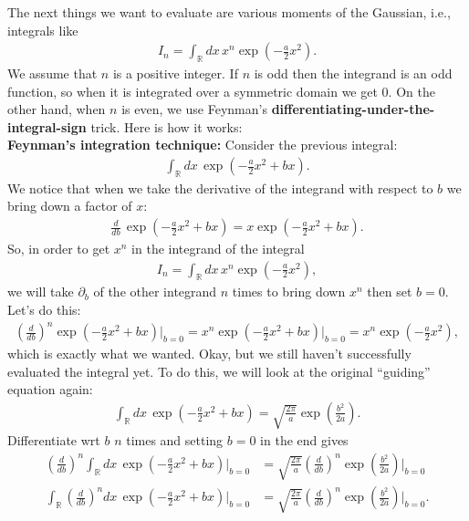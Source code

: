 \documentclass{book}
\theoremstyle{definition}
\newcommand{\p}{\partial}
\newcommand{\f}[2]{\frac{#1}{#2}}
\newcommand{\lp}{\left(}
\newcommand{\rp}{\right)}
\begin{document}
The next things we want to evaluate are various moments of the Gaussian, i.e., integrals like
\begin{align}
I_n = \int_\mathbb{R} dx\, x^n \exp\lp -\f{a}{2}x^2 \rp.
\end{align}
We assume that $n$ is a positive integer. If $n$ is odd then the integrand is an odd function, so when it is integrated over a symmetric domain we get 0. On the other hand, when $n$ is even, we use Feynman's \textbf{differentiating-under-the-integral-sign} trick. Here is how it works:\\


\textbf{Feynman's integration technique:} Consider the previous integral:
\begin{align}
\int_\mathbb{R} dx\, \exp\lp -\f{a}{2}x^2 + bx \rp.
\end{align}  
We notice that when we take the derivative of the integrand with respect to $b$ we bring down a factor of $x$:
\begin{align}
\f{d}{db}\, \exp\lp -\f{a}{2}x^2 + bx \rp = x\exp\lp -\f{a}{2}x^2 + bx \rp.
\end{align}
So, in order to get $x^n$ in the integrand of the integral
\begin{align}
I_n = \int_\mathbb{R} dx\, x^n \exp\lp -\f{a}{2}x^2 \rp,
\end{align}
we will take $\p_b$ of the other integrand $n$ times to bring down $x^n$ then set $b = 0$. Let's do this:
\begin{align}
\lp\f{d}{db}\rp^n \exp\lp -\f{a}{2}x^2 + bx \rp \bigg\vert_{b=0} = x^n \exp\lp -\f{a}{2}x^2 + bx \rp\bigg\vert_{b=0} = x^n \exp\lp -\f{a}{2}x^2\rp,
\end{align}
which is exactly what we wanted. Okay, but we still haven't successfully evaluated the integral yet. To do this, we will look at the original ``guiding'' equation again:
\begin{align}
\int_\mathbb{R} dx\, \exp\lp -\f{a}{2}x^2 + bx \rp = \sqrt{\f{2\pi}{a}} \exp\lp \f{b^2}{2a} \rp.
\end{align}
Differentiate wrt $b$ $n$ times and setting $b = 0$ in the end gives
\begin{align}
\lp\f{d}{db}\rp^n \int_\mathbb{R} dx\, \exp\lp -\f{a}{2}x^2 + bx \rp \bigg\vert_{b=0} 
&= \sqrt{\f{2\pi}{a}}\lp\f{d}{db}\rp^n \exp\lp \f{b^2}{2a} \rp\bigg\vert_{b=0} \nonumber \\
\int_\mathbb{R}\lp\f{d}{db}\rp^n  dx\, \exp\lp -\f{a}{2}x^2 + bx \rp\bigg\vert_{b=0} 
&= \sqrt{\f{2\pi}{a}}\lp\f{d}{db}\rp^n \exp\lp \f{b^2}{2a} \rp\bigg\vert_{b=0}.
\end{align}
\end{document}
